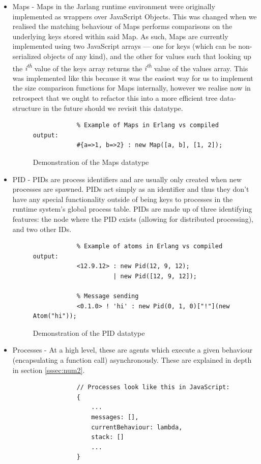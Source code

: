 \documentclass[twoside,12pt,titlepage,a4paper]{article}
\begin{document}
\begin{itemize}
	\item Maps - Maps in the Jarlang runtime environment were originally implemented as wrappers over JavaScript Objects. This was changed when we realised the matching behaviour of Maps performs comparisons on the underlying keys stored within said Map. As such, Maps are currently implemented using two JavaScript arrays --- one for keys (which can be non-serialized objects of any kind), and the other for values such that looking up the \textit{i\textsuperscript{th}} value of the keys array returns the \textit{i\textsuperscript{th}} value of the values array. This was implemented like this because it was the easiest way for us to implement the size comparison functions for Maps internally, however we realise now in retrospect that we ought to refactor this into a more efficient tree data-structure in the future should we revisit this datatype.
	\begin{figure}[H]
	\begin{verbatim}
	        % Example of Maps in Erlang vs compiled output:
	        #{a=>1, b=>2} : new Map([a, b], [1, 2]);
	\end{verbatim}
	\caption{Demonstration of the Maps datatype}
	\end{figure}

	\item PID - PIDs are process identifiers and are usually only created when new processes are spawned. PIDs act simply as an identifier and thus they don't have any special functionality outside of being keys to processes in the runtime system's global process table. PIDs are made up of three identifying features: the node where the PID exists (allowing for distributed processing), and two other IDs.
	\begin{figure}[H]
	\begin{verbatim}
	        % Example of atoms in Erlang vs compiled output:
	        <12.9.12> : new Pid(12, 9, 12);
	                  | new Pid([12, 9, 12]);
	        
	        % Message sending
	        <0.1.0> ! 'hi' : new Pid(0, 1, 0)["!"](new Atom("hi"));
	\end{verbatim}
	\caption{Demonstration of the PID datatype}
	\end{figure}

	\item Processes - At a high level, these are agents which execute a given behaviour (encapsulating a function call) asynchronously. These are explained in depth in section \ref{sssec:num2}.
	\begin{figure}[H]
	\begin{verbatim}
	        // Processes look like this in JavaScript:
	        {
	            ...
	            messages: [],
	            currentBehaviour: lambda,
	            stack: []
	            ...
	        }


\end{verbatim}
\end{figure}
\end{itemize}
\end{document}
